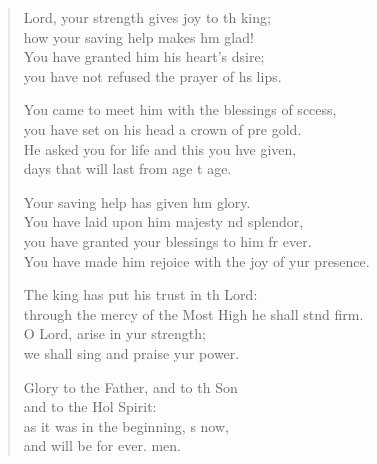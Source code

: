 \settowidth{\versewidth}{You have made him rejoice with the joy of your presence.}
\begin{verse}%
  \begin{patverse}
 Lord, your strength gives joy to th king;\Med\\
how your saving help makes h\pointup{\i}m glad!\\
You have granted him his heart’s dsire;\Med\\
you have not refused the prayer of h\pointup{\i}s lips.

You came to meet him with the blessings of sccess,\Med\\
you have set on his head a crown of pre gold.\\
He asked you for life and this you hve given,\Med\\
days that will last from age t age.

Your saving help has given h\pointup{\i}m glory.\Med\\
You have laid upon him majesty nd splendor,\\
you have granted your blessings to him fr ever.\Med\\
You have made him rejoice with the joy of yur presence.

The king has put his trust in th Lord:\Med\\
through the mercy of the Most High he shall stnd firm.\\
O Lord, arise in yur strength;\Med\\
we shall sing and praise yur power.

Glory to the Father, and to th Son\Med\\
and to the Hol Spirit:\\
as it was in the beginning, \pointup{\i}s now,\Med\\
and will be for ever. men.
  \end{patverse}
\end{verse}
